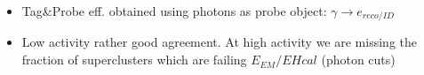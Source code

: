 \documentclass{beamer}
\begin{document}
\begin{frame}
\begin{columns}
\begin{column}{0.33\textwidth}
   \end{column}
  \end{columns}
\begin{itemize}
 \item Tag\&Probe eff. obtained using photons as probe object: $\gamma \rightarrow e_{reco/ID}$ 
 \item Low activity rather good agreement. At high activity we are missing the fraction of superclusters which are failing $E_{EM}/E{Hcal}$ (photon cuts)
\end{itemize}
\end{frame}
\end{document}
